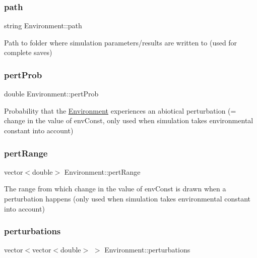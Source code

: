\subsubsection{\texorpdfstring{path}{path}}
{\footnotesize\ttfamily string Environment\+::path\hspace{0.3cm}{\ttfamily [protected]}}

Path to folder where simulation parameters/results are written to (used for complete saves) \mbox{\label{classEnvironment_ae56ec7b378c091a2173281b01d87249b}} 
\subsubsection{\texorpdfstring{pert\+Prob}{pertProb}}
{\footnotesize\ttfamily double Environment\+::pert\+Prob\hspace{0.3cm}{\ttfamily [protected]}}

Probability that the \hyperlink{classEnvironment}{Environment} experiences an abiotical perturbation (= change in the value of env\+Const, only used when simulation takes environmental constant into account) \mbox{\label{classEnvironment_af1c4ab4f5795e5c789bcd76f80736c5c}} 
\subsubsection{\texorpdfstring{pert\+Range}{pertRange}}
{\footnotesize\ttfamily vector$<$double$>$ Environment\+::pert\+Range\hspace{0.3cm}{\ttfamily [protected]}}

The range from which change in the value of env\+Const is drawn when a perturbation happens (only used when simulation takes environmental constant into account) \mbox{\label{classEnvironment_a9339f48bc16de4c77313f70d4f201458}} 
\subsubsection{\texorpdfstring{perturbations}{perturbations}}
{\footnotesize\ttfamily vector$<$vector$<$double$>$ $>$ Environment\+::perturbations\hspace{0.3cm}{\ttfamily [protected]}}

